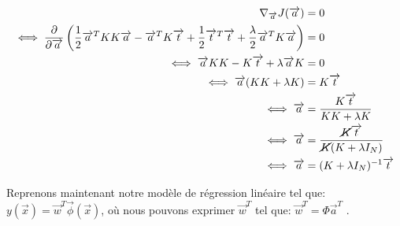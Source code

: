 \begin{equation}
\begin{split}
	\nabla_{\overrightarrow{a}} J(\overrightarrow{a}) &= 0 \\
	\iff \frac{\partial}{\partial \overrightarrow{a}} \left(\frac{1}{2} \overrightarrow{a}^T K K \overrightarrow{a} - \overrightarrow{a}^T K \overrightarrow{t} + \frac{1}{2} \overrightarrow{t}^T \overrightarrow{t} + \frac{\lambda}{2} \overrightarrow{a}^T K \overrightarrow{a}\right) &= 0 \\
	\iff \overrightarrow{a} K K - K \overrightarrow{t} + \lambda \overrightarrow{a} K &= 0 \\
	\iff \overrightarrow{a}(KK+\lambda K) &= K \overrightarrow{t}\\
	\iff \overrightarrow{a} &= \frac{K \overrightarrow{t}}{KK + \lambda K} \\
	\iff \overrightarrow{a} &= \frac{\cancel{K} \overrightarrow{t}}{\cancel{K}(K+\lambda I_N)} \\
	\iff \overrightarrow{a} &= (K + \lambda I_N)^{-1} \overrightarrow{t}
\end{split}
\end{equation}

Reprenons maintenant notre modèle de régression linéaire tel que: $ y(\overrightarrow{x}) = \overrightarrow{w}^T \overrightarrow{\phi}(\overrightarrow{x}) $, où nous pouvons exprimer $ \overrightarrow{w}^T $ tel que: $\overrightarrow{w}^T = \Phi \overrightarrow{a}^T$ .

